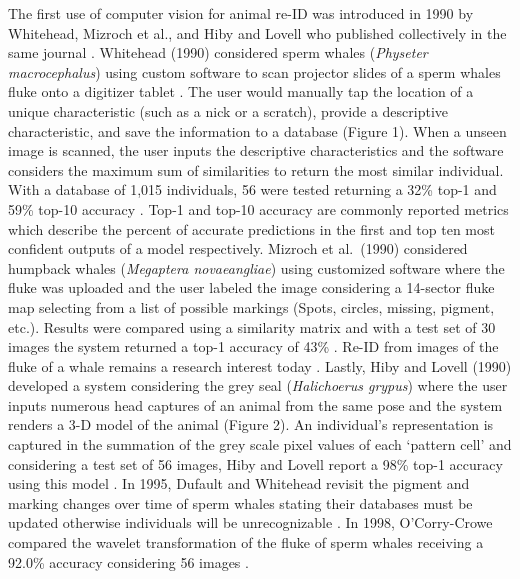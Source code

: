 \documentclass[11pt]{article}
\begin{document}
The first use of computer vision for animal re-ID was introduced in 1990 by Whitehead, Mizroch et al., and Hiby and Lovell who published collectively in the same journal \cite{whitehead1990computer, mizroch1990computer, hiby1990computer}. Whitehead (1990) considered sperm whales (\textit{Physeter macrocephalus}) using custom software to scan projector slides of a sperm whales fluke onto a digitizer tablet \cite{whitehead1990computer}. The user would manually tap the location of a unique characteristic (such as a nick or a scratch), provide a descriptive characteristic, and save the information to a database (Figure 1). When a unseen image is scanned, the user inputs the descriptive characteristics and the software considers the maximum sum of similarities to return the most similar individual. With a database of 1,015 individuals, 56 were tested returning a 32\% top-1 and 59\% top-10 accuracy \cite{whitehead1990computer}. Top-1 and top-10 accuracy are commonly reported metrics which describe the percent of accurate predictions in the first and top ten most confident outputs of a model respectively. Mizroch et al.\ (1990) considered humpback whales (\textit{Megaptera novaeangliae}) using customized software where the fluke was uploaded and the user labeled the image considering a 14-sector fluke map selecting from a list of possible markings (Spots, circles, missing, pigment, etc.). Results were compared using a similarity matrix and with a test set of 30 images the system returned a top-1 accuracy of 43\% \cite{mizroch1990computer}. Re-ID from images of the fluke of a whale remains a research interest today \cite{kagglehumpbackreid}. Lastly, Hiby and Lovell (1990) developed a system considering the grey seal (\textit{Halichoerus grypus}) where the user inputs numerous head captures of an animal from the same pose and the system renders a 3-D model of the animal \cite{hiby1990computer} (Figure 2). An individual's representation is captured in the summation of the grey scale pixel values of each `pattern cell' and considering a test set of 56 images, Hiby and Lovell report a 98\% top-1 accuracy using this model \cite{hiby1990computer}. In 1995, Dufault and Whitehead revisit the pigment and marking changes over time of sperm whales stating their databases must be updated otherwise individuals will be unrecognizable \cite{dufault1995assessment}. In 1998, O'Corry-Crowe compared the wavelet transformation of the fluke of sperm whales receiving a 92.0\% accuracy considering 56 images \cite{o1998identification}. 
\newline
\\
\end{document}
